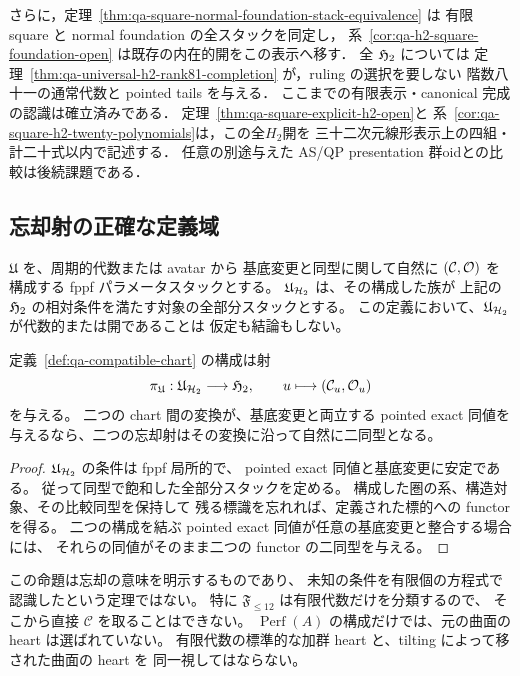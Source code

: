 さらに，定理~\ref{thm:qa-square-normal-foundation-stack-equivalence} は
有限 square と normal foundation の全スタックを同定し，
系~\ref{cor:qa-h2-square-foundation-open} は既存の内在的開をこの表示へ移す．
全 $\mathfrak H_2$ については
定理~\ref{thm:qa-universal-h2-rank81-completion} が，ruling の選択を要しない
階数八十一の通常代数と pointed tails を与える．
ここまでの有限表示・canonical 完成の認識は確立済みである．
定理~\ref{thm:qa-square-explicit-h2-open}と
系~\ref{cor:qa-square-h2-twenty-polynomials}は，この全$H_2$開を
三十二次元線形表示上の四組・計二十式以内で記述する．
任意の別途与えた AS/QP presentation 群oidとの比較は後続課題である．

\subsection{忘却射の正確な定義域}

\begin{definition}[内在的条件に適合する族]
\label{def:qa-compatible-chart}
\(\mathfrak U\) を、周期的代数または avatar から
基底変更と同型に関して自然に \((\mathcal C,\mathcal O)\) を構成する
fppf パラメータスタックとする。
\(\mathfrak U_{\mathcal H_2}\) は、その構成した族が
上記の \(\mathfrak H_2\) の相対条件を満たす対象の全部分スタックとする。
この定義において、\(\mathfrak U_{\mathcal H_2}\) が代数的または開であることは
仮定も結論もしない。
\end{definition}

\begin{proposition}[適合族からの忘却]
\label{prop:qa-compatible-forgetting}
定義~\ref{def:qa-compatible-chart} の構成は射
\[
 \pi_{\mathfrak U}:\mathfrak U_{\mathcal H_2}\longrightarrow\mathfrak H_2,
 \qquad u\longmapsto(\mathcal C_u,\mathcal O_u)
\]
を与える。
二つの chart 間の変換が、基底変更と両立する pointed exact 同値を
与えるなら、二つの忘却射はその変換に沿って自然に二同型となる。
\end{proposition}
\begin{proof}
\(\mathfrak U_{\mathcal H_2}\) の条件は fppf 局所的で、
pointed exact 同値と基底変更に安定である。
従って同型で飽和した全部分スタックを定める。
構成した圏の系、構造対象、その比較同型を保持して
残る標識を忘れれば、定義された標的への functor を得る。
二つの構成を結ぶ pointed exact 同値が任意の基底変更と整合する場合には、
それらの同値がそのまま二つの functor の二同型を与える。
\end{proof}

この命題は忘却の意味を明示するものであり、
未知の条件を有限個の方程式で認識したという定理ではない。
特に \(\mathfrak F_{\le12}\) は有限代数だけを分類するので、
そこから直接 \(\mathcal C\) を取ることはできない。
\(\operatorname{Perf}(A)\) の構成だけでは、元の曲面の heart は選ばれていない。
有限代数の標準的な加群 heart と、tilting によって移された曲面の heart を
同一視してはならない。


